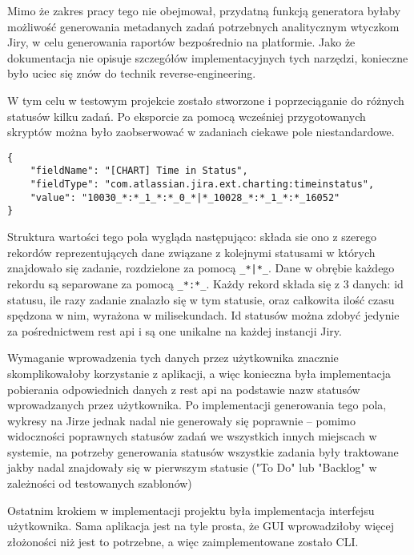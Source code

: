 Mimo że zakres pracy tego nie obejmował, przydatną funkcją generatora byłaby możliwość generowania metadanych zadań potrzebnych analitycznym wtyczkom Jiry, w celu generowania raportów bezpośrednio na platformie.
Jako że dokumentacja nie opisuje szczegółów implementacyjnych tych narzędzi, konieczne było uciec się znów do technik reverse-engineering.

W tym celu w testowym projekcie zostało stworzone i poprzeciąganie do różnych statusów kilku zadań. Po eksporcie za pomocą wcześniej przygotowanych skryptów można było zaobserwować w zadaniach ciekawe pole niestandardowe.
\begin{lstlisting}[caption=Pole niestandardowe "time in status"]
{
    "fieldName": "[CHART] Time in Status",
    "fieldType": "com.atlassian.jira.ext.charting:timeinstatus",
    "value": "10030_*:*_1_*:*_0_*|*_10028_*:*_1_*:*_16052"
}
\end{lstlisting}
Struktura wartości tego pola wygląda następująco: składa sie ono z szerego rekordów reprezentujących dane związane z kolejnymi statusami w których znajdowało się zadanie, rozdzielone za pomocą \lstinline!_*|*_!.
Dane w obrębie każdego rekordu są separowane za pomocą \lstinline!_*:*_!. Każdy rekord składa się z 3 danych: id statusu, ile razy zadanie znalazło się w tym statusie, oraz całkowita ilość czasu spędzona w nim, wyrażona w milisekundach.
Id statusów można zdobyć jedynie za pośrednictwem rest api i są one unikalne na każdej instancji Jiry.

Wymaganie wprowadzenia tych danych przez użytkownika znacznie skomplikowałoby korzystanie z aplikacji, a więc konieczna była implementacja
pobierania odpowiednich danych z rest api na podstawie nazw statusów wprowadzanych przez użytkownika. Po implementacji generowania tego pola, wykresy na Jirze jednak nadal nie generowały się poprawnie -- pomimo widoczności poprawnych statusów
zadań we wszystkich innych miejscach w systemie, na potrzeby generowania statusów wszystkie zadania były traktowane jakby nadal znajdowały się w pierwszym statusie ("To Do" lub "Backlog" w zależności od testowanych szablonów)

Ostatnim krokiem w implementacji projektu była implementacja interfejsu użytkownika. Sama aplikacja jest na tyle prosta, że GUI wprowadziłoby więcej
złożoności niż jest to potrzebne, a więc zaimplementowane zostało CLI.

